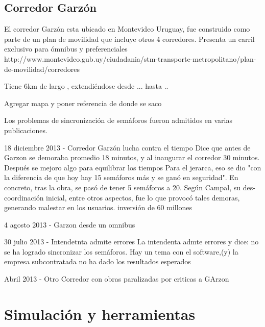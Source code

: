 \subsection{Corredor Garzón}
El corredor Garzón esta ubicado en Montevideo Uruguay, fue construido como parte de un plan de movilidad que incluye otros 4 corredores. 
Presenta un carril exclusivo para ómnibus y preferenciales
http://www.montevideo.gub.uy/ciudadania/stm-transporte-metropolitano/plan-de-movilidad/corredores

Tiene 6km de largo , extendiéndose desde ...  hasta ..

Agregar mapa y poner referencia de donde se saco

Los problemas de sincronización de semáforos fueron admitidos en varias publicaciones.

18 diciembre 2013 - Corredor Garzón lucha contra el tiempo %
Dice que antes de Garzon se demoraba promedio 18 minutos, y al inaugurar el corredor 30 minutos. Después se mejoro algo para equilibrar los tiempos
Para el jerarca, eso se dio "con la diferencia de que hoy hay 15 semáforos más y se ganó en seguridad". En concreto, tras la obra, se pasó de tener 5 semáforos a 20. Según Campal, su des-coordinación inicial, entre otros aspectos, fue lo que provocó tales demoras, generando malestar en los usuarios.
inversión de 60 millones


4 agosto 2013 - Garzon desde un omnibus %


30 julio 2013  - Intendetnta admite errores %
La intendenta admte errores y dice: no se ha logrado sincronizar los semáforos. Hay un tema con el software,(y) la empresa subcontratada no ha dado los resultados esperados


Abril 2013 - Otro Corredor con obras paralizadas por criticas a GArzon






\section{Simulación y herramientas}

